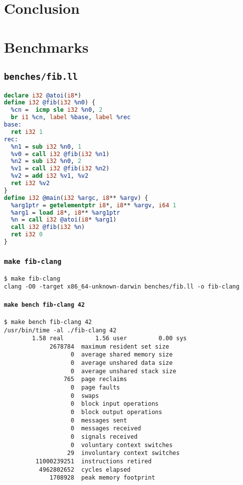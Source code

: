 \documentclass{article}
\begin{document}
\section{Conclusion}



\printbibliography[title={References}]

\appendix

\newpage
\section{Benchmarks}

\subsection{\lstinline!benches/fib.ll!}
\begin{lstlisting}[language=LLVM]
declare i32 @atoi(i8*)
define i32 @fib(i32 %n0) {
  %cn =  icmp sle i32 %n0, 2
  br i1 %cn, label %base, label %rec
base:
  ret i32 1
rec:
  %n1 = sub i32 %n0, 1
  %v0 = call i32 @fib(i32 %n1)
  %n2 = sub i32 %n0, 2
  %v1 = call i32 @fib(i32 %n2)
  %v2 = add i32 %v1, %v2
  ret i32 %v2
}
define i32 @main(i32 %argc, i8** %argv) {
  %arg1ptr = getelementptr i8*, i8** %argv, i64 1
  %arg1 = load i8*, i8** %arg1ptr
  %n = call i32 @atoi(i8* %arg1)
  call i32 @fib(i32 %n)
  ret i32 0
}

\end{lstlisting}

\subsubsection{\lstinline!make fib-clang!}
\begin{lstlisting}[language=none]
$ make fib-clang
clang -O0 -target x86_64-unknown-darwin benches/fib.ll -o fib-clang
\end{lstlisting}
\paragraph{\lstinline!make bench fib-clang 42!}
\begin{lstlisting}[language=none]
$ make bench fib-clang 42
/usr/bin/time -al ./fib-clang 42
        1.58 real         1.56 user         0.00 sys
             2678784  maximum resident set size
                   0  average shared memory size
                   0  average unshared data size
                   0  average unshared stack size
                 765  page reclaims
                   0  page faults
                   0  swaps
                   0  block input operations
                   0  block output operations
                   0  messages sent
                   0  messages received
                   0  signals received
                   0  voluntary context switches
                  29  involuntary context switches
         11000239251  instructions retired
          4962802652  cycles elapsed
             1708928  peak memory footprint
\end{lstlisting}
\end{document}
